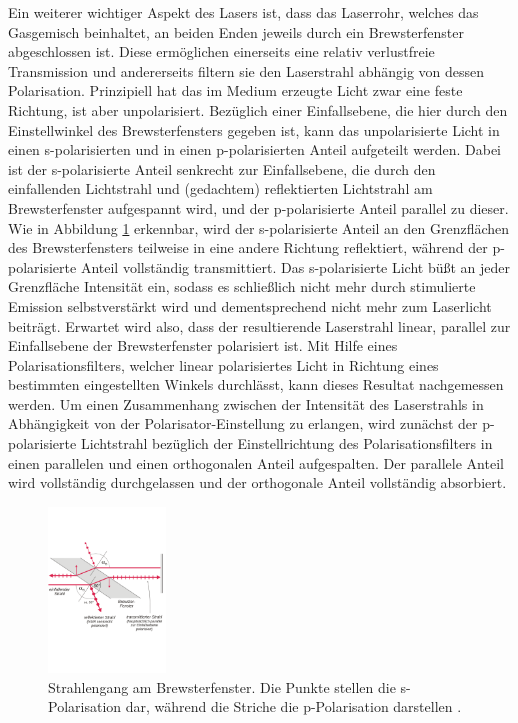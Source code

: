 Ein weiterer wichtiger Aspekt des Lasers ist, dass das Laserrohr, welches das Gasgemisch beinhaltet,
an beiden Enden jeweils durch ein Brewsterfenster abgeschlossen ist. Diese ermöglichen einerseits
eine relativ verlustfreie Transmission und andererseits filtern sie den Laserstrahl abhängig
von dessen Polarisation. Prinzipiell hat das im Medium erzeugte Licht zwar eine feste Richtung,
ist aber unpolarisiert. Bezüglich einer Einfallsebene, die hier durch den Einstellwinkel des
Brewsterfensters gegeben ist, kann das unpolarisierte Licht in einen s-polarisierten und in einen
p-polarisierten Anteil aufgeteilt werden. Dabei ist der s-polarisierte Anteil senkrecht zur Einfallsebene, die
durch den einfallenden Lichtstrahl und (gedachtem) reflektierten Lichtstrahl am Brewsterfenster aufgespannt wird,
und der p-polarisierte Anteil parallel zu dieser. Wie in Abbildung \ref{fig:brewster} erkennbar,
wird der s-polarisierte Anteil an den Grenzflächen des Brewsterfensters teilweise in eine andere Richtung reflektiert,
während der p-polarisierte Anteil vollständig transmittiert. Das s-polarisierte Licht büßt an jeder
Grenzfläche Intensität ein, sodass es schließlich nicht mehr durch stimulierte Emission selbstverstärkt
wird und dementsprechend nicht mehr zum Laserlicht beiträgt. Erwartet wird also, dass der resultierende
Laserstrahl linear, parallel zur Einfallsebene der Brewsterfenster polarisiert ist. Mit Hilfe eines
Polarisationsfilters, welcher linear polarisiertes Licht in Richtung eines bestimmten eingestellten
Winkels durchlässt, kann dieses Resultat nachgemessen werden. Um einen Zusammenhang zwischen der
Intensität des Laserstrahls in Abhängigkeit von der Polarisator-Einstellung zu erlangen, wird
zunächst der p-polarisierte Lichtstrahl bezüglich der Einstellrichtung des Polarisationsfilters in einen
parallelen und einen orthogonalen Anteil aufgespalten. Der parallele Anteil wird vollständig durchgelassen
und der orthogonale Anteil vollständig absorbiert.

\begin{figure}[H]
  \centering
  \includegraphics[height = 4.4cm]{Pics von Buddy/brewster.png}
  \caption{Strahlengang am Brewsterfenster. Die Punkte stellen die s-Polarisation dar, während die
  Striche die p-Polarisation darstellen \cite{goettingen}.}
  \label{fig:brewster}
\end{figure}

